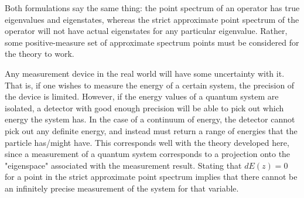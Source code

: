 Both formulations say the same thing: the point spectrum of an operator has true
eigenvalues and eigenstates, whereas the strict approximate point spectrum of
the operator will not have actual eigenstates for any particular eigenvalue.
Rather, some positive-measure set of approximate spectrum points must be
considered for the theory to work. 

Any measurement device in the real world will
have some uncertainty with it. That is, if one wishes to measure the energy of a
certain system, the precision of the device is limited. However, if the energy
values of a quantum system are isolated, a detector with good enough precision
will be able to pick out which energy the system has. In the case of a continuum
of energy, the detector cannot pick out any definite energy, and instead must
return a range of energies that the particle has/might have. This corresponds
well with the theory developed here, since a measurement of a quantum system
corresponds to a projection onto the "eigenspace" associated with the
measurement result. Stating that $dE(z)=0$ for a point in the strict approximate
point spectrum implies that there cannot be an infinitely precise measurement of
the system for that variable.
